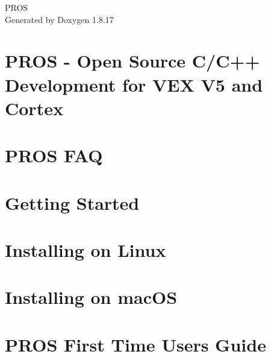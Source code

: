 \let\mypdfximage\pdfximage\def\pdfximage{\immediate\mypdfximage}\documentclass[twoside]{book}
\newcommand{\+}{\discretionary{\mbox{\scriptsize$\hookleftarrow$}}{}{}}
\newcommand{\clearemptydoublepage}{%
  \newpage{\pagestyle{empty}\cleardoublepage}%
}
\begin{document}
\hypersetup{pageanchor=false,
             bookmarksnumbered=true,
             pdfencoding=unicode
            }
\begin{titlepage}
\vspace*{7cm}
\begin{center}%
{\Large P\+R\+OS }\\
\vspace*{1cm}
{\large Generated by Doxygen 1.8.17}\\
\end{center}
\end{titlepage}
\clearemptydoublepage
{}
\tableofcontents
\clearemptydoublepage
{}
\hypersetup{pageanchor=true}

\chapter{P\+R\+OS -\/ Open Source C/\+C++ Development for V\+EX V5 and Cortex}
\label{index}\hypertarget{index}{}
\chapter{P\+R\+OS F\+AQ}
\label{md_docs_getting-started_faq}

\chapter{Getting Started}
\label{md_docs_getting-started_index}

\chapter{Installing on Linux}
\label{md_docs_getting-started_linux}

\chapter{Installing on mac\+OS}
\label{md_docs_getting-started_macos}

\chapter{P\+R\+OS First Time Users Guide}
\label{md_docs_getting-started_new-users}

\end{document}

